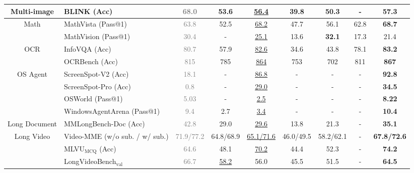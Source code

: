 \documentclass{article}
\newcommand{\gpto}[1]{\textcolor{gray}{#1}}
\begin{document}
\begin{table}[h!]
\begin{tabular}{@{}c l |  c c | c  c c | c c@{}}
    \multirow{1}{66pt}{Multi-image}
    & BLINK {\tiny (Acc)}  & \gpto{68.0} & 53.6 & \underline{56.4} & 39.8 & 50.3 & - & \textbf{57.3} \\
    \midrule
    
    \multirow{2}{66pt}{Math}
    & MathVista {\tiny (Pass@1)}  & \gpto{63.8} & 52.5 & \underline{68.2} & 47.7 & 56.1 & 62.8  & \textbf{68.7} \\
    & MathVision {\tiny (Pass@1)}  & \gpto{30.4} & - & \underline{25.1} & 13.6 & \textbf{32.1} & 17.3  & {21.4} \\
    \midrule
    
    \multirow{2}{66pt}{OCR} 
    & InfoVQA  {\tiny (Acc)}  & \gpto{80.7} & 57.9 & \underline{82.6} & 34.6 & 43.8 & 78.1  & \textbf{83.2}   \\
    & OCRBench {\tiny (Acc)}  & \gpto{815} & 785 & \underline{864} & 753 & 702 & 811  & \textbf{867} \\
    \midrule
    
    \multirow{4}{66pt}{OS Agent} 
    & ScreenSpot-V2 {\tiny (Acc)}    & \gpto{18.1}  & - &  \underline{86.8}  & -  & - & - &  \textbf{92.8} \\
    & ScreenSpot-Pro {\tiny (Acc)}  &  \gpto{0.8}  & -  &  \underline{29.0} &  - & - & - &  \textbf{34.5}  \\
    & OSWorld {\tiny (Pass@1)}         &  \gpto{5.03}  & -  &  \underline{2.5} & -  & - & - & \textbf{8.22}    \\   
    & WindowsAgentArena {\tiny (Pass@1)\footnotemark} & \gpto{9.4} & 2.7 & \underline{3.4} & - & - & - & \textbf{10.4}     \\
    \midrule
    
    \multirow{1}{66pt}{Long Document} 
    & MMLongBench-Doc {\tiny (Acc)}    & \gpto{42.8}  & 29.0  &  \underline{29.6} & 13.8  & 21.3 & -  & \textbf{35.1}  \\
    \midrule
    
    \multirow{3}{66pt}{Long Video}
    & Video-MME {\tiny (w/o sub. / w/ sub.)}  & \gpto{71.9/77.2}  & 64.8/68.9  & \underline{65.1/71.6}  &  46.0/49.5  & 58.2/62.1 & - & \textbf{67.8/72.6} \\
    & MLVU$_{\text{MCQ}}$ {\tiny (Acc)}   & \gpto{64.6}  & 48.1  &  \underline{70.2}  &  44.4 & 52.3  & -  & \textbf{74.2} \\
    & LongVideoBench$_{\text{val}}$   & \gpto{66.7}  &  \underline{58.2}  &  56.0 & 45.5  & 51.5  & - & \textbf{64.5}  \\
    \midrule


\end{tabular}
\end{table}
\end{document}
